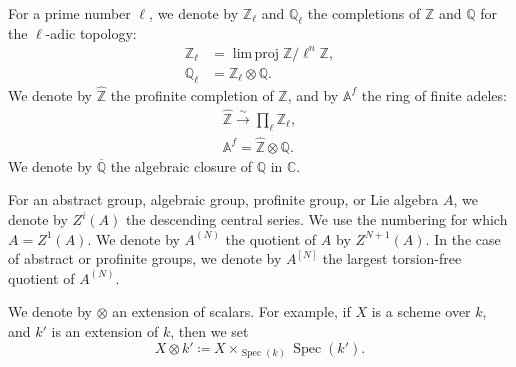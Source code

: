 \documentclass{article}
\theoremstyle{definition}
\newenvironment{env}[1]
  {\renewcommand\theinnerenv{(#1)}\innerenv}
  {\endinnerenv}
\newcommand{\bb}{\mathbb}
\newcommand{\ZZ}{\bb{Z}}
\newcommand{\hZZ}{\widehat{\bb{Z}}}
\renewcommand{\AA}{\bb{A}}
\newcommand{\CC}{\bb{C}}
\newcommand{\QQ}{\bb{Q}}
\newcommand{\cQQ}{\overline{\QQ}}
\DeclareMathOperator{\Spec}{Spec}
\DeclareMathOperator{\limproj}{lim\,proj}
\begin{document}
\begin{env}{0.2}
\label{0.2}
  For a prime number $\ell$, we denote by $\ZZ_\ell$ and $\QQ_\ell$ the completions of $\ZZ$ and $\QQ$ for the $\ell$-adic topology:
  \[
    \begin{aligned}
      \ZZ_\ell &= \limproj \ZZ/\ell^n\ZZ,
    \\\QQ_\ell &= \ZZ_\ell\otimes\QQ.
    \end{aligned}
  \]
  We denote by $\hZZ$ the profinite completion of $\ZZ$, and by $\AA^f$ the ring of finite adeles:
  \[
    \begin{gathered}
      \hZZ \xrightarrow{\sim} \prod_\ell \ZZ_\ell,
    \\\AA^f = \hZZ\otimes\QQ.
    \end{gathered}
  \]
  We denote by $\cQQ$ the algebraic closure of $\QQ$ in $\CC$.
\end{env}

\begin{env}{0.3}
\label{0.3}
  For an abstract group, algebraic group, profinite group, or Lie algebra $A$, we denote by $Z^i(A)$ the descending central series.
  We use the numbering for which $A=Z^1(A)$.
  We denote by $A^{(N)}$ the quotient of $A$ by $Z^{N+1}(A)$.
  In the case of abstract or profinite groups, we denote by $A^{[N]}$ the largest torsion-free quotient of $A^{(N)}$.
\end{env}

\begin{env}{0.4}
\label{0.4}
  We denote by $\otimes$ an extension of scalars.
  For example, if $X$ is a scheme over $k$, and $k'$ is an extension of $k$, then we set
  \[
    X\otimes k'
    \coloneqq X\times_{\Spec(k)}\Spec(k').
  \]
\end{env}
\end{document}
